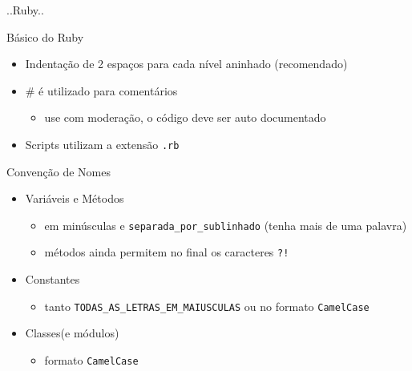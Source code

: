 \begin{frame}[fragile,t]{..Ruby..}
		
\end{frame}
\begin{frame}[fragile,t]{Básico do Ruby}
  \begin{itemize}
    \item Indentação de \alert{2 espaços} para cada nível aninhado (\alert{recomendado})
    \item \# é utilizado para comentários
    \begin{itemize}
    	\item use com moderação, o código deve ser \alert{auto documentado}
    \end{itemize}
    \item Scripts utilizam a extensão \verb!.rb! 
		
  \end{itemize}   
\end{frame}
\begin{frame}[fragile,t]{Convenção de Nomes}
  \begin{itemize}
    \item Variáveis e Métodos
    \begin{itemize}
    	\item em \alert{minúsculas} e \verb!separada_por_sublinhado! (tenha mais de uma palavra)
    	\item métodos ainda permitem no final os caracteres \verb|?!|
    \end{itemize}
    \item Constantes
    \begin{itemize}
    	\item tanto \verb!TODAS_AS_LETRAS_EM_MAIUSCULAS! ou no formato \verb!CamelCase!
    \end{itemize}
    \item Classes(e módulos)
    \begin{itemize}
    	\item formato \verb!CamelCase! 
    \end{itemize}
  \end{itemize}
\end{frame}
